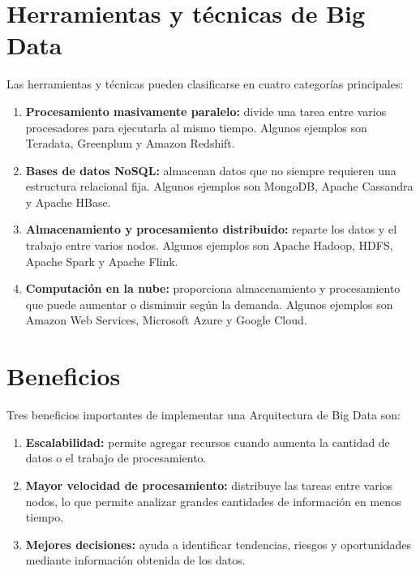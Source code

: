 \section{Herramientas y técnicas de Big Data}

Las herramientas y técnicas pueden clasificarse en cuatro categorías
principales:

\begin{enumerate}
    \item \textbf{Procesamiento masivamente paralelo:} divide una tarea entre
    varios procesadores para ejecutarla al mismo tiempo. Algunos ejemplos son
    Teradata, Greenplum y Amazon Redshift.

    \item \textbf{Bases de datos NoSQL:} almacenan datos que no siempre
    requieren una estructura relacional fija. Algunos ejemplos son MongoDB,
    Apache Cassandra y Apache HBase.

    \item \textbf{Almacenamiento y procesamiento distribuido:} reparte los
    datos y el trabajo entre varios nodos. Algunos ejemplos son Apache Hadoop,
    HDFS, Apache Spark y Apache Flink.

    \item \textbf{Computación en la nube:} proporciona almacenamiento y
    procesamiento que puede aumentar o disminuir según la demanda. Algunos
    ejemplos son Amazon Web Services, Microsoft Azure y Google Cloud.
\end{enumerate}

\section{Beneficios}

Tres beneficios importantes de implementar una Arquitectura de Big Data son:

\begin{enumerate}
    \item \textbf{Escalabilidad:} permite agregar recursos cuando aumenta la
    cantidad de datos o el trabajo de procesamiento.

    \item \textbf{Mayor velocidad de procesamiento:} distribuye las tareas
    entre varios nodos, lo que permite analizar grandes cantidades de
    información en menos tiempo.

    \item \textbf{Mejores decisiones:} ayuda a identificar tendencias,
    riesgos y oportunidades mediante información obtenida de los datos.
\end{enumerate}


